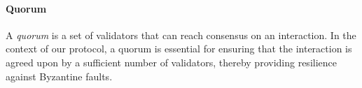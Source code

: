 

\paragraph{\textbf{Quorum}}

A \emph{quorum} is a set of validators that can reach consensus on an interaction. In the context of our protocol, a quorum is essential for ensuring that the interaction is agreed upon by a sufficient number of validators, thereby providing resilience against Byzantine faults. 

